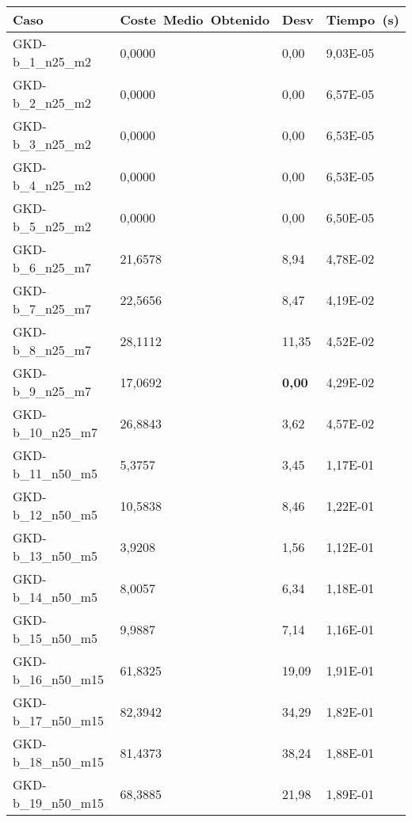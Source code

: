 \pagebreak

\begin{table}[!ht]%
    \centering    
    \begin{adjustbox}{height=12cm}
    \begin{tabular}{|l|l|l|l|}
    \hline
        Caso & Coste~Medio~Obtenido & Desv & Tiempo~(s) \\ \hline
        GKD-b\_1\_n25\_m2    & 0,0000   & 0,00          & 9,03E-05 \\ \hline
        GKD-b\_2\_n25\_m2    & 0,0000   & 0,00          & 6,57E-05 \\ \hline
        GKD-b\_3\_n25\_m2    & 0,0000   & 0,00          & 6,53E-05 \\ \hline
        GKD-b\_4\_n25\_m2    & 0,0000   & 0,00          & 6,53E-05 \\ \hline
        GKD-b\_5\_n25\_m2    & 0,0000   & 0,00          & 6,50E-05 \\ \hline
        GKD-b\_6\_n25\_m7    & 21,6578  & 8,94          & 4,78E-02 \\ \hline
        GKD-b\_7\_n25\_m7    & 22,5656  & 8,47          & 4,19E-02 \\ \hline
        GKD-b\_8\_n25\_m7    & 28,1112  & 11,35         & 4,52E-02 \\ \hline
        GKD-b\_9\_n25\_m7    & 17,0692  & \textbf{0,00} & 4,29E-02 \\ \hline
        GKD-b\_10\_n25\_m7   & 26,8843  & 3,62          & 4,57E-02 \\ \hline
        GKD-b\_11\_n50\_m5   & 5,3757   & 3,45          & 1,17E-01 \\ \hline
        GKD-b\_12\_n50\_m5   & 10,5838  & 8,46          & 1,22E-01 \\ \hline
        GKD-b\_13\_n50\_m5   & 3,9208   & 1,56          & 1,12E-01 \\ \hline
        GKD-b\_14\_n50\_m5   & 8,0057   & 6,34          & 1,18E-01 \\ \hline
        GKD-b\_15\_n50\_m5   & 9,9887   & 7,14          & 1,16E-01 \\ \hline
        GKD-b\_16\_n50\_m15  & 61,8325  & 19,09         & 1,91E-01 \\ \hline
        GKD-b\_17\_n50\_m15  & 82,3942  & 34,29         & 1,82E-01 \\ \hline
        GKD-b\_18\_n50\_m15  & 81,4373  & 38,24         & 1,88E-01 \\ \hline
        GKD-b\_19\_n50\_m15  & 68,3885  & 21,98         & 1,89E-01 \\ \hline

\end{tabular}
\end{adjustbox}
\end{table}
